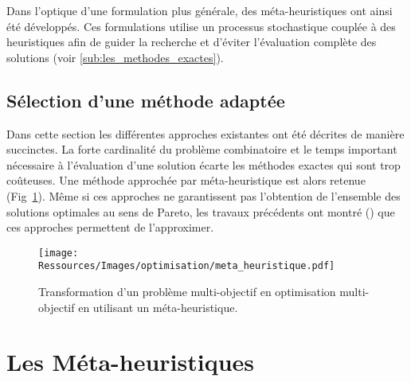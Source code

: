 Dans l’optique d’une formulation plus générale, des méta-heuristiques ont ainsi été développés.
Ces formulations utilise un processus stochastique couplée à des heuristiques afin de guider
la recherche et d’éviter l’évaluation complète des solutions (voir \ref{sub:les_methodes_exactes}).



\subsection{Sélection d’une méthode adaptée} %
\label{sub:selection_d_une_methode_adaptee}
Dans cette section les différentes approches existantes ont été décrites de manière
succinctes. La forte cardinalité du problème combinatoire et le temps important nécessaire
à l’évaluation d’une solution écarte les méthodes exactes qui sont trop coûteuses. Une
méthode approchée par méta-heuristique est alors retenue (Fig~\ref{fig:multi_meta}).
Même si ces approches ne garantissent pas l’obtention de l’ensemble des solutions
optimales au sens de Pareto, les travaux précédents ont montré ()
que ces approches permettent de l’approximer.

\begin{figure}
    \begin{center}
        \texttt{[image: Ressources/Images/optimisation/meta\_heuristique.pdf]}
    \end{center}
    \caption{Transformation d’un problème multi-objectif en optimisation
             multi-objectif en utilisant un méta-heuristique.
             \label{fig:multi_meta}}
\end{figure}




\section{Les Méta-heuristiques} %
\label{sec:les_meta_heuristiques}
